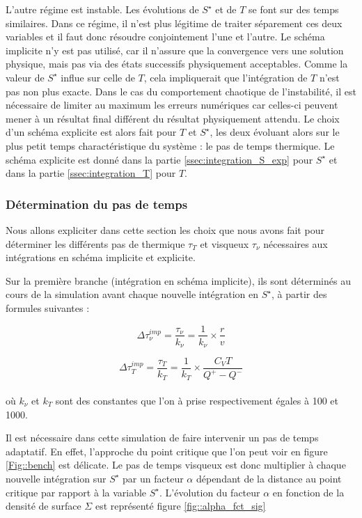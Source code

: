 L'autre régime est instable. Les évolutions de $S^\star$ et de $T$ se font sur
des temps similaires. Dans ce régime, il n'est plus légitime de traiter
séparement ces deux variables et il faut donc résoudre conjointement l'une et
l'autre. Le schéma implicite n'y est pas utilisé, car il n'assure que la
convergence vers une solution physique, mais pas via des états successifs
physiquement acceptables. Comme la valeur de $S^\star$ influe sur celle de $T$,
cela impliquerait que l'intégration de $T$ n'est pas non plus exacte. Dans le
cas du comportement chaotique de l'instabilité, il est nécessaire de limiter au
maximum les erreurs numériques car celles-ci peuvent mener à un résultat final
différent du résultat physiquement attendu. Le choix d'un schéma explicite est
alors fait pour $T$ et $S^\star$, les deux évoluant alors sur le plus petit
temps charactéristique du système : le pas de temps thermique. Le schéma
explicite est donné dans la partie \ref{ssec:integration_S_exp} pour $S^\star$
et dans la partie \ref{ssec:integration_T} pour $T$.

\subsubsection{Détermination du pas de temps\label{sec::pas_de_temps}}

Nous allons expliciter dans cette section les choix que nous avons fait pour
déterminer les différents pas de thermique $\tau_T$ et visqueux $\tau_\nu$
nécessaires aux intégrations en schéma implicite et explicite.

Sur la première branche (intégration en schéma implicite), ils sont déterminés
au cours de la simulation avant chaque nouvelle intégration en $S^\star$, à
partir des formules suivantes : 

\begin{equation}
	\Delta \tau_\nu^{imp} = \frac{\tau_\nu}{k_{\nu}} = \frac{1}{k_{\nu}} \times \frac{r}{v}
\end{equation}

\begin{equation}
	\Delta \tau_{T}^{imp} = \frac{\tau_{T}}{k_{T}}= \frac{1}{k_{T}} \times \frac{C_{V} T}{Q^{+} - Q^{-}}
\end{equation} \\

où $k_{\nu}$ et $k_{T}$ sont des constantes que l'on à prise respectivement égales à 100 et 1000.

Il est nécessaire dans cette simulation de faire intervenir un pas de temps
adaptatif. En effet, l'approche du point critique que l'on peut voir en figure
\ref{Fig::bench} est délicate. Le pas de temps visqueux est donc multiplier à
chaque nouvelle intégration sur $S^\star$ par un facteur $\alpha$ dépendant de la
distance au point critique par rapport à la variable $S^\star$. L'évolution du facteur $\alpha$ en fonction de la densité de surface $\Sigma$ est représenté figure \ref{fig::alpha_fct_sig} 


